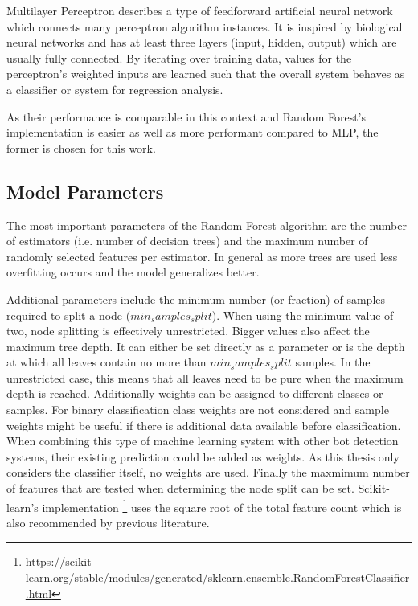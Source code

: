 \documentclass[
    fontsize=12pt,
    headings=small,
    parskip=half,           %
    bibliography=totoc,
    numbers=noenddot,       %
    open=any,               %
    final,                   %
    table
]{scrreprt}
\begin{document}
Multilayer Perceptron describes a type of feedforward artificial neural network which connects many perceptron algorithm instances. It is inspired by biological neural networks and has at least three layers (input, hidden, output) which are usually fully connected. By iterating over training data, values for the perceptron's weighted inputs are learned such that the overall system behaves as a classifier or system for regression analysis.

As their performance is comparable in this context and Random Forest's implementation is easier as well as more performant compared to MLP, the former is chosen for this work.

\subsection{Model Parameters}

The most important parameters of the Random Forest algorithm are the number of estimators (i.e. number of decision trees) and the maximum number of randomly selected features per estimator. In general as more trees are used less overfitting occurs and the model generalizes better. \todo

Additional parameters include the minimum number (or fraction) of samples required to split a node ($min_samples_split$). When using the minimum value of two, node splitting is effectively unrestricted. Bigger values also affect the maximum tree depth. It can either be set directly as a parameter or is the depth at which all leaves contain no more than $min_samples_split$ samples. In the unrestricted case, this means that all leaves need to be pure when the maximum depth is reached. Additionally weights can be assigned to different classes or samples. For binary classification class weights are not considered and sample weights might be useful if there is additional data available before classification. When combining this type of machine learning system with other bot detection systems, their existing prediction could be added as weights. As this thesis only considers the classifier itself, no weights are used. Finally the maxmimum number of features that are tested when determining the node split can be set. Scikit-learn's implementation \footnote{\url{https://scikit-learn.org/stable/modules/generated/sklearn.ensemble.RandomForestClassifier.html}} uses the square root of the total feature count which is also recommended by previous literature. \cite{Hastie2009}
\end{document}

